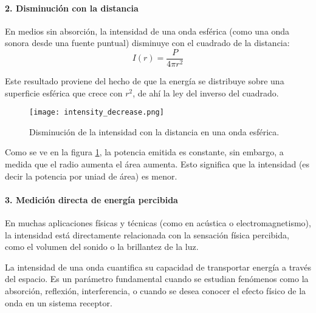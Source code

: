 \paragraph{2. Disminución con la distancia}

En medios sin absorción, la intensidad de una onda esférica (como una onda sonora desde una fuente puntual) disminuye con el cuadrado de la distancia:
\[
I(r) = \frac{P}{4\pi r^2}
\]

Este resultado proviene del hecho de que la energía se distribuye sobre una superficie esférica que crece con \(r^2\), de ahí la ley del inverso del cuadrado.
\begin{figure}[ht]
  \centering
  \texttt{[image: intensity\_decrease.png]}
  \caption{Disminución de la intensidad con la distancia en una onda esférica.}
  \label{fig:intensity_decrease}
\end{figure}
Como se ve en la figura \ref{fig:intensity_decrease}, la potencia emitida es constante, sin embargo, a medida que el radio aumenta el área aumenta. Esto significa que la intensidad (es decir la potencia por uniad de área) es menor.

\paragraph{3. Medición directa de energía percibida}

En muchas aplicaciones físicas y técnicas (como en acústica o electromagnetismo), la intensidad está directamente relacionada con la sensación física percibida, como el volumen del sonido o la brillantez de la luz.

La intensidad de una onda cuantifica su capacidad de transportar energía a través del espacio. Es un parámetro fundamental cuando se estudian fenómenos como la absorción, reflexión, interferencia, o cuando se desea conocer el efecto físico de la onda en un sistema receptor.
